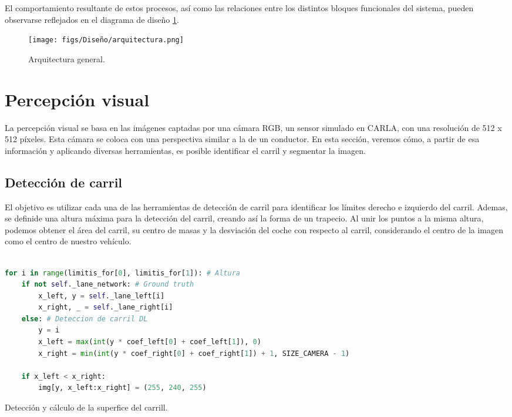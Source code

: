 El comportamiento resultante de estos procesos, así como las relaciones entre los distintos bloques funcionales del sistema, pueden observarse reflejados en el diagrama de diseño \ref{fig:arch}.

\begin{figure}[ht]
  \centering
  \texttt{[image: figs/Diseño/arquitectura.png]}
  \caption{Arquitectura general.}
  \label{fig:arch}
\end{figure}

\section{Percepción visual}

La percepción visual se basa en las imágenes captadas por una cámara RGB, un sensor simulado en CARLA, con una resolución de 512 x 512 píxeles. Esta cámara se coloca con una perspectiva similar a la de un conductor. En esta sección, veremos cómo, a partir de esa información y aplicando diversas herramientas, es posible identificar el carril y segmentar la imagen.

\subsection{Detección de carril}

El objetivo es utilizar cada una de las herramientas de detección de carril para identificar los límites derecho e izquierdo del carril. Ademas, se definide una altura máxima para la detección del carril, creando así la forma de un trapecio. Al unir los puntos a la misma altura, podemos obtener el área del carril, su centro de masas y la desviación del coche con respecto al carril, considerando el centro de la imagen como el centro de nuestro vehículo.

\begin{code}[h]
\begin{lstlisting}[language=Python]

for i in range(limitis_for[0], limitis_for[1]): # Altura
	if not self._lane_network: # Ground truth
		x_left, y = self._lane_left[i]
		x_right, _ = self._lane_right[i]
	else: # Deteccion de carril DL
		y = i
		x_left = max(int(y * coef_left[0] + coef_left[1]), 0)
		x_right = min(int(y * coef_right[0] + coef_right[1]) + 1, SIZE_CAMERA - 1)

	if x_left < x_right:
		img[y, x_left:x_right] = (255, 240, 255)
\end{lstlisting}
\caption[Detección y cálculo de la superfice del carril]{Detección y cálculo de la superfice del carrill.}
\label{code:detectar_carril}
\end{code}

